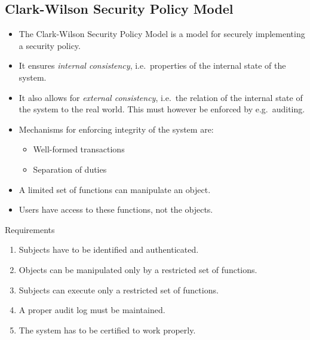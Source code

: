 \subsection{Clark-Wilson Security Policy Model}

\begin{frame}
  \begin{itemize}
    \item The Clark-Wilson Security Policy Model is a model for securely 
      implementing a security policy.

    \item It ensures \emph{internal consistency}, i.e.\ properties of the 
      internal state of the system.

    \item It also allows for \emph{external consistency}, i.e.\ the relation of 
      the internal state of the system to the real world.
      This must however be enforced by e.g.\ auditing.
  \end{itemize}
\end{frame}

\begin{frame}
  \begin{itemize}
    \item Mechanisms for enforcing integrity of the system are:
      \begin{itemize}
        \item Well-formed transactions

        \item Separation of duties
      \end{itemize}
  \end{itemize}

  \pause{}

  \begin{definition}
    \begin{itemize}
      \item A limited set of functions can manipulate an object.
      \item Users have access to these functions, not the objects.
    \end{itemize}
  \end{definition}
\end{frame}

\begin{frame}
  \begin{block}{Requirements}
    \begin{enumerate}
      \item Subjects have to be identified and authenticated.
      \item Objects can be manipulated only by a restricted set of functions.
      \item Subjects can execute only a restricted set of functions.
      \item A proper audit log must be maintained.
      \item The system has to be certified to work properly.
    \end{enumerate}
  \end{block}
\end{frame}

